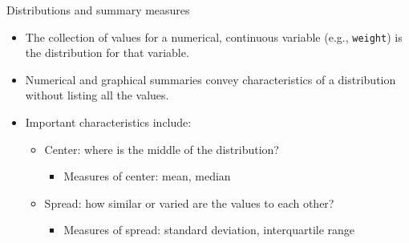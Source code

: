 \documentclass[10pt,handout]{beamer}\usepackage[]{graphicx}\usepackage[]{color}
\makeatletter
\newcommand{\hlopt}[1]{\textcolor[rgb]{0,0,0}{#1}}%
\newcommand{\hlstd}[1]{\textcolor[rgb]{0.345,0.345,0.345}{#1}}%
\newcommand{\hlkwd}[1]{\textcolor[rgb]{0.737,0.353,0.396}{\textbf{#1}}}%
\newenvironment{kframe}{%
 \def\at@end@of@kframe{}%
 \ifinner\ifhmode%
  \def\at@end@of@kframe{\end{minipage}}%
  \begin{minipage}{\columnwidth}%
 \fi\fi%
 \def\FrameCommand##1{\hskip\@totalleftmargin \hskip-\fboxsep
 \colorbox{shadecolor}{##1}\hskip-\fboxsep
     \hskip-\linewidth \hskip-\@totalleftmargin \hskip\columnwidth}%
 \MakeFramed {\advance\hsize-\width
   \@totalleftmargin\z@ \linewidth\hsize
   \@setminipage}}%
 {\par\unskip\endMakeFramed%
 \at@end@of@kframe}
\newenvironment{knitrout}{}{} %
\makeatother
\begin{document}
\begin{frame}{Distributions and summary measures}
	\protect\hypertarget{distributions-and-summary-measures}{}

\begin{itemize}
	\item  The collection of values for a numerical, continuous variable (e.g.,
	\texttt{weight}) is the \alert{distribution} for that variable.
	
	\pause 
	
\item 	Numerical and graphical summaries convey characteristics of a
	distribution without listing all the values.
	
\item Important characteristics include:
	
	\begin{itemize}
		\tightlist
		\item
		Center: where is the middle of the distribution?
		
		\begin{itemize}
			\tightlist
			\item
			Measures of center: mean, median
		\end{itemize}
	\pause 
	
		\item
		Spread: how similar or varied are the values to each other?
		
		\begin{itemize}
			\tightlist
			\item
			Measures of spread: standard deviation, interquartile range
		\end{itemize}
	\end{itemize}

\end{itemize}
	
\end{frame}



\end{document}
